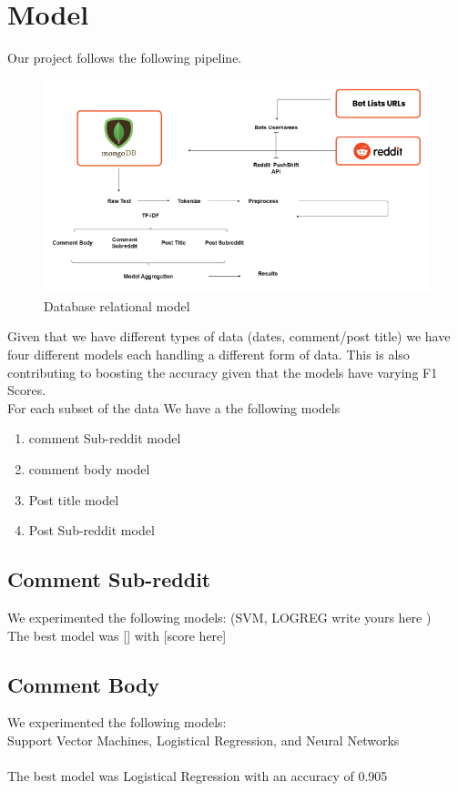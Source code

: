 \documentclass{article}
\begin{document}
\section{Model}
    Our project follows the following pipeline. \par
    \begin{figure}[H]
        \centering
        \includegraphics[width=15cm ,keepaspectratio]{pipeline}
        \caption{Database relational model}
    \end{figure} 
    Given that we have different types of data (dates, comment/post title) we have four different models each handling a different form of data. This is also contributing to boosting the accuracy given that the models have varying F1 Scores.\\
    For each subset of the data We have a the following models
    \begin{enumerate}
        \item comment Sub-reddit model
        \item comment body model
        \item Post title model
        \item Post Sub-reddit model
    \end{enumerate}
    
    \subsection{Comment Sub-reddit}
        We experimented the following models: (SVM, LOGREG write yours here )\\
        The best model was [] with [score here]
    \subsection{Comment Body}
        We experimented the following models: \\ Support Vector Machines, Logistical Regression, and Neural Networks \\
\\
        The best model was Logistical Regression with an accuracy of 0.905
        
\end{document}
